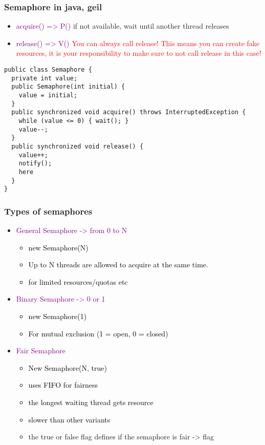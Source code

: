 \documentclass[main.tex,fontsize=8pt,paper=a4,paper=portrait,DIV=calc,]{scrartcl}
\begin{document}
\subsubsection{Semaphore in java, geil}
\begin{itemize}
\item \textcolor{purple}{acquire() => P()}\newline
  if not available, wait until another thread releases
\item \textcolor{purple}{release() => V()}\newline
  \textcolor{red}{You can always call release! This means you can create fake resources, it is your responsibility to make sure to not call release in this case!}
\end{itemize} 
\begin{lstlisting}
public class Semaphore {
  private int value;
  public Semaphore(int initial) {
    value = initial;
  }
  public synchronized void acquire() throws InterruptedException {
    while (value <= 0) { wait(); }
    value--;
  }
  public synchronized void release() {
    value++;
    notify();
    here
  }
}
\end{lstlisting}

\subsubsection{Types of semaphores}
\begin{itemize}
\item \textcolor{purple}{General Semaphore -> from 0 to N}\newline
  \begin{itemize}
  \item \textcolor{black}{new Semaphore(N)}
  \item \textcolor{black}{Up to N threads are allowed to acquire at the same time.}
  \item \textcolor{black}{for limited resources/quotas etc}
  \end{itemize} 
\item \textcolor{purple}{Binary Semaphore -> 0 or 1}\newline
  \begin{itemize}
  \item \textcolor{black}{new Semaphore(1)}
  \item \textcolor{black}{For mutual exclusion (1 = open, 0 = closed)}
  \end{itemize} 
\item \textcolor{purple}{Fair Semaphore}\newline
  \begin{itemize}
  \item \textcolor{black}{New Semaphore(N, true)}
  \item \textcolor{black}{uses FIFO for fairness}
  \item \textcolor{black}{the longest waiting thread gets resource}
  \item \textcolor{black}{slower than other variants}
  \item the true or false flag defines if the semaphore is fair -> flag
  \end{itemize} 
\end{itemize} 
\end{document}
